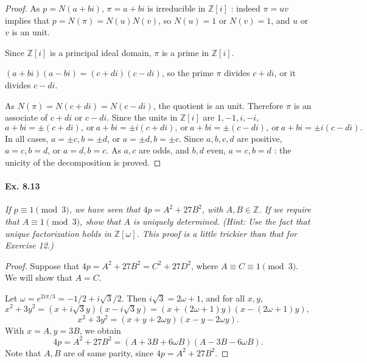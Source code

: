\documentclass[11pt,a4paper]{article}
\newcommand{\Z}{\mathbb{Z}}
\begin{document}
{\begin{proof}
As $p = N(a+bi)$, $\pi = a+bi$ is irreducible in $\Z[i]$ : indeed $\pi = uv$ implies that $p=N(\pi) = N(u)N(v)$, so $N(u)= 1$ or $N(v) = 1$, and $u$ or $v$ is an unit.

Since $\Z[i]$ is a principal ideal domain, $\pi$ is a prime in $\Z[i]$.

$(a+bi)(a-bi) = (c+di)(c-di)$, so the prime $\pi$ divides $c+di$, or it divides $c-di$.

As $N(\pi) = N(c+di) = N(c-di)$, the quotient is an unit. Therefore $\pi$ is an associate of $c+di$ or $c-di$. Since the units in $\Z[i]$ are $1,-1,i,-i$,
$$a+bi = \pm (c+di),\ \mathrm{or}\ a+bi = \pm i (c+di), \ \mathrm{or}\ a+bi = \pm (c-di), \ \mathrm{or}\ a+bi = \pm i(c-di).$$
In all cases, $a=\pm c, b = \pm d$, or $a=\pm d, b = \pm c$.
Since $a,b,c,d$ are positive, $a=c, b=d$, or $a=d,b=c$.
As $a,c$ are odds, and $b,d$ even, $a=c, b=d$ : the unicity of the decomposition is proved.
\end{proof}

\paragraph{Ex. 8.13}

{\it If $p\equiv 1 \pmod 3$, we have seen that $4p = A^2+27B^2$, with $A,B \in \Z$. If we require that $A\equiv 1 \pmod 3$, show that $A$ is uniquely determined. (Hint: Use the fact that unique factorization holds in $\Z[\omega]$. This proof is a little trickier than that for Exercise 12.)
}

\begin{proof}
Suppose that $4p = A^2 + 27 B^2 = C^2 + 27 D^2$, where $A \equiv C \equiv 1 \pmod 3$. We will show that $A = C$.

Let $\omega = e^{2i\pi/3} = -1/2 + i \sqrt{3}/2$. Then $i\sqrt{3} = 2 \omega +1$, and for all $x,y$,
$x^2 + 3 y^2 = (x+i\sqrt{3}y)(x-i\sqrt{3}y) = (x + (2\omega+1)y)(x - (2\omega+1)y),$
$$x^2+3y^2 = (x+y+2\omega y)(x-y-2\omega y).$$
With $x =A, y = 3B$, we obtain
$$4p = A^2+27B^2 = (A+3B+6\omega B)(A-3B-6\omega B).$$
Note that $A,B$ are of same parity, since $4p = A^2 + 27 B^2$.


\end{proof}}
\end{document}
